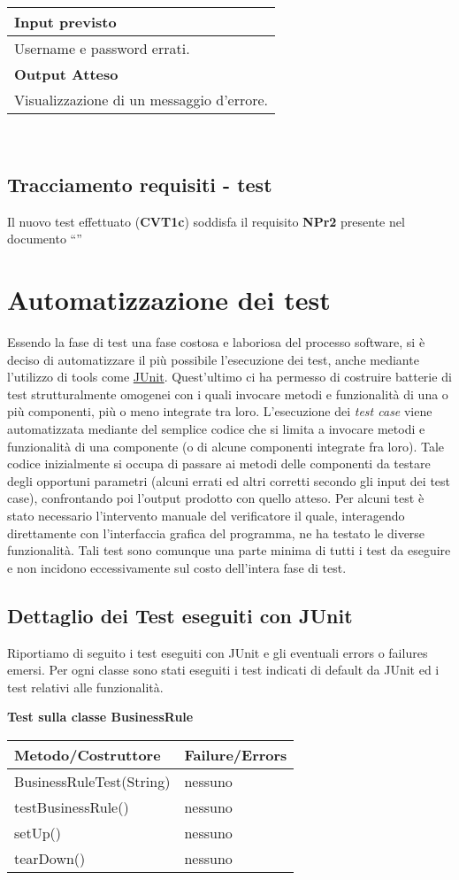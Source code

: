 \begin{tabular}{|p{11cm}|} \hline
\textbf{Input previsto}\\ \hline
Username e password errati.\\ \hline
\textbf{Output Atteso}\\ \hline
Visualizzazione di un messaggio d'errore.\\ \hline
\end{tabular} \\
\section{Tracciamento requisiti - test}
Il nuovo test effettuato (\textbf{CVT1c}) soddisfa il requisito \textbf{NPr2} presente nel documento ``\AR'' 
\chapter{Automatizzazione dei test}
Essendo la fase di test una fase costosa e laboriosa del processo software, si \`e deciso di automatizzare il pi\`u possibile l'esecuzione dei test, anche mediante l'utilizzo  di tools come \underline{JUnit}. Quest'ultimo ci ha permesso di costruire batterie di test strutturalmente omogenei  con i quali invocare metodi e funzionalit\`a di una o pi\`u componenti, pi\`u o meno integrate tra loro. 
L'esecuzione dei \textit{test case} viene automatizzata mediante del semplice codice che si limita a invocare metodi e funzionalit\`a di una componente (o di alcune componenti integrate fra loro). Tale codice inizialmente si occupa di passare ai metodi delle componenti da testare degli opportuni parametri (alcuni errati ed altri corretti secondo gli input dei test case), confrontando poi l’output prodotto con quello atteso. 
Per alcuni test \`e stato necessario l'intervento manuale del verificatore il quale, interagendo direttamente con l'interfaccia grafica del programma, ne ha testato le diverse funzionalit\`a. Tali test sono comunque una parte minima di tutti i test da eseguire e non incidono eccessivamente sul costo dell'intera fase di test.
\section{Dettaglio dei Test eseguiti con JUnit}
Riportiamo di seguito i test eseguiti con JUnit e gli eventuali errors o failures emersi.
Per ogni classe sono stati eseguiti i test indicati di default da JUnit ed i test relativi alle funzionalit\`a.

\textbf{Test sulla classe BusinessRule} \\
\begin{center}
\begin{tabular}{|p{}|p{3 cm}|} \hline
\textbf{Metodo/Costruttore} & \textbf{Failure/Errors} \\ \hline
BusinessRuleTest(String) & nessuno \\ \hline
testBusinessRule() & nessuno \\ \hline
setUp() & nessuno \\ \hline
tearDown() & nessuno \\ \hline
\end{tabular}
\end{center}

